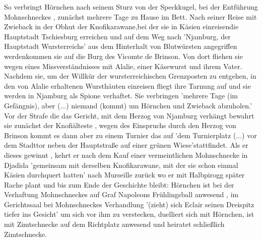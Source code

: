 {So verbringt Hörnchen nach seinem Sturz von der Speckkugel, bei der Entführung Mohnschneckes \cite[S.34]{pir}, zunächst mehrere Tage zu Hause im Bett. \cite[7. Kapitel]{pir}\cite[S.82]{pir} Nach seiner Reise mit Zwieback in der Obhut der Knofikarawane,\cite[S.124ff]{pir}bei der sie in Käsien einreisen\cite[S.140]{pir}die Hauptstadt Tschiesburg erreichen\cite[S.164ff]{pir} und auf dem Weg nach 'Njamburg, der Hauptstadt Wursterreichs'\cite[S.218]{pir} aus dem Hinterhalt von Blutwürsten angegriffen werden\cite[S.224ff]{pir}kommen sie auf die Burg des Vicomte de Brinson.\cite[S.233]{pir} Von dort fliehen sie\cite[S.239ff]{pir} wegen eines Missverständnisses mit Alalie, einer Käsewurst\cite[S.230f]{pir} und ihrem Vater.\cite[S.233ff]{pir} Nachdem sie, um der Willkür der wursterreichischen Grenzposten zu entgehen, \cite[S.285]{pir} in den von Alalie erhaltenen Wursthäuten\cite[S.242]{pir} einreisen \cite[S.287f]{pir}fliegt ihre Tarnung auf \cite[S.293]{pir} und sie werden in Njamburg\cite[S.289ff]{pir} als Spione verhaftet. \cite[S.293]{pir} Sie verbringen 'mehrere Tage (im Gefängnis), aber (...) niemand (kommt) um Hörnchen und Zwieback abzuholen.'\cite[S.322]{pir} Vor der Strafe die das Gericht, mit dem Herzog von Njamburg\cite[S.324ff]{pir} verhängt bewahrt sie zunächst der Knofiälteste \cite[S.327]{pir}, wegen des Einspruchs durch den Herzog von Brinson \cite[S.332]{pir} kommt es dann aber zu einem Turnier \cite[S.335ff]{pir} das auf 'dem Turnierplatz (...) vor dem Stadttor neben der Hauptstraße auf einer grünen Wiese'\cite[S.343]{pir}stattfindet. Als er dieses gewinnt \cite[S.357]{pir}, kehrt er nach dem Kauf einer vermeintlichen Mohnschnecke in Djadida \cite[S.388ff]{pir} 'gemeinsam mit derselben Knofikarawane, mit der sie schon einmal Käsien durchquert hatten' \cite[S.506]{pir} nach Murseille zurück \cite[S.506]{pir} wo er mit Halbpirogg später Rache plant \cite[S.540ff]{pir} und bis zum Ende der Geschichte bleibt: Hörnchen ist bei der Verhaftung Mohnschneckes auf Graf Napoleons Frühlingsball anwesend \cite[S.549ff]{pir}, im Gerichtssaal bei Mohnschneckes Verhandlung '(zieht) sich Eclair seinen Dreispitz tiefer ins Gesicht' \cite[S.570]{pir} um sich vor  ihm zu verstecken, duelliert sich mit Hörnchen,\cite[S.594]{pir} ist mit Zimtschnecke auf dem Richtplatz anwesend\cite[S.609]{pir} und heiratet schließlich Zimtschnecke. \cite[S.644]{pir}

}
